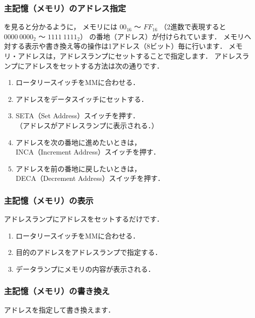 \subsubsection{主記憶（メモリ）のアドレス指定}
を見ると分かるように，
メモリには $00_{16}$ 〜 $FF_{16}$
（2進数で表現すると $0000~0000_{2}$ 〜 $1111~1111_{2}$）
の番地（アドレス）が付けられています．
メモリへ対する表示や書き換え等の操作は1アドレス（8ビット）毎に行います．
メモリ・アドレスは，アドレスランプにセットすることで指定します．
アドレスランプにアドレスをセットする方法は次の通りです．

\begin{enumerate}
\item ロータリースイッチをMMに合わせる．
\item アドレスをデータスイッチにセットする．
\item SETA（Set Address）スイッチを押す．\\
  （アドレスがアドレスランプに表示される．）
\item アドレスを次の番地に進めたいときは，\\
  INCA（Increment Address）スイッチを押す．
\item アドレスを前の番地に戻したいときは，\\
  DECA（Decrement Address）スイッチを押す．
\end{enumerate}

\subsubsection{主記憶（メモリ）の表示}
アドレスランプにアドレスをセットするだけです．

\begin{enumerate}
\item ロータリースイッチをMMに合わせる．
\item 目的のアドレスをアドレスランプで指定する．
\item データランプにメモリの内容が表示される．
\end{enumerate}

\subsubsection{主記憶（メモリ）の書き換え}
アドレスを指定して書き換えます．

